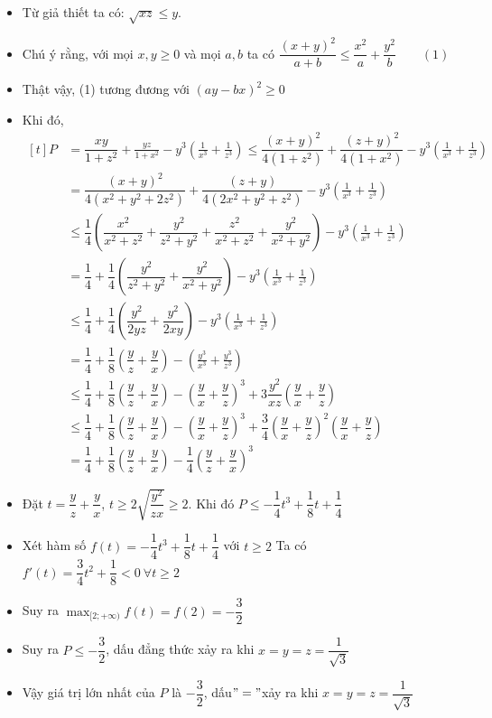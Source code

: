 \lgi  
\begin{itemize}[label=,leftmargin=*]
\item Từ giả thiết ta có: $\sqrt{xz}\le y.$
\item Chú ý rằng, với mọi $x,y \ge 0$ và mọi $a,b$ ta có $\dfrac{(x+y)^2}{a+b} \le \dfrac{x^2}{a}+\dfrac{y^2}{b}  \qquad (1)$
\item Thật vậy, (1) tương đương với $(ay-bx)^2 \ge 0$
\item Khi đó, $\begin{aligned}[t]
P &=\dfrac{xy}{1+z^2}+\frac{yz}{1+x^2}-y^3 \left(\frac{1}{x^3} +\frac{1}{z^3}\right) \le \dfrac{(x+y)^2}{4(1+z^2)} +\dfrac{(z+y)^2}{4(1+x^2)}-y^3 \left(\frac{1}{x^3} +\frac{1}{z^3}\right) 
\\
&= \dfrac{(x+y)^2}{4(x^2 +y^2+2z^2)} + \dfrac{(z+y)}{4(2x^2+y^2+z^2)} -y^3 \left(\frac{1}{x^3} +\frac{1}{z^3}\right) 
\\
&\le \dfrac{1}{4}{\left(\dfrac{x^2}{x^2+z^2}+\dfrac{y^2}{z^2+y^2} +\dfrac{z^2}{x^2+z^2}+\dfrac{y^2}{x^2+y^2}\right)} -y^3 \left(\frac{1}{x^3} +\frac{1}{z^3}\right) 
\\
&= \dfrac{1}{4}+\dfrac{1}{4}\left( \dfrac{y^2}{z^2+y^2}+\dfrac{y^2}{x^2+y^2}\right)-y^3 \left(\frac{1}{x^3} +\frac{1}{z^3}\right) 
\\
&\le \dfrac{1}{4}+\dfrac{1}{4}\left( \dfrac{y^2}{2yz}+\dfrac{y^2}{2xy}\right)-y^3 \left(\frac{1}{x^3} +\frac{1}{z^3}\right) 
\\
&=\dfrac{1}{4}+\dfrac{1}{8}\left(\dfrac{y}{z}+\dfrac{y}{x}\right)- \left(\frac{y^3}{x^3} +\frac{y^3}{z^3}\right) 
\\
&\le \dfrac{1}{4}+\dfrac{1}{8}\left(\dfrac{y}{z}+\dfrac{y}{x}\right) -\left(\dfrac{y}{x}+\dfrac{y}{z}\right)^3 +3\dfrac{y^2}{xz}\left(\dfrac{y}{x}+\dfrac{y}{z}\right)
\\
&\le \dfrac{1}{4}+\dfrac{1}{8}\left(\dfrac{y}{z}+\dfrac{y}{x}\right) -\left(\dfrac{y}{x}+\dfrac{y}{z}\right)^3 + \dfrac{3}{4}\left(\dfrac{y}{x}+\dfrac{y}{z}\right)^2\left(\dfrac{y}{x}+\dfrac{y}{z}\right)
\\
&= \dfrac{1}{4}+\dfrac{1}{8}\left(\dfrac{y}{z}+\dfrac{y}{x}\right)-\dfrac{1}{4}\left(\dfrac{y}{z}+\dfrac{y}{x}\right)^3
\end{aligned}$
\item Đặt $t=\dfrac{y}{z}+\dfrac{y}{x}$, $t \ge 2 \sqrt{\dfrac{y^2}{zx}}\ge 2$. Khi đó 
$P\le -\dfrac{1}{4}t^3+\dfrac{1}{8}t+\dfrac{1}{4}$
\item Xét hàm số $f(t)=-\dfrac{1}{4}t^3+\dfrac{1}{8}t+\dfrac{1}{4}$ với $t \ge 2$
 Ta có $f'(t)=\dfrac{3}{4}t^2+\dfrac{1}{8}<0 \ \forall t\ge2$
 \item  Suy ra $\displaystyle \max_{[2;+\infty )}f(t)=f(2)=-\dfrac{3}{2}$
 \item Suy ra $P\le -\dfrac{3}{2}$, dấu đẳng thức xảy ra khi $x=y=z=\dfrac{1}{\sqrt{3}}$
 \item Vậy giá trị lớn nhất của $P$ là $ -\dfrac{3}{2}$, dấu$ "=" $xảy ra khi  $x=y=z=\dfrac{1}{\sqrt{3}}$
  \end{itemize}

